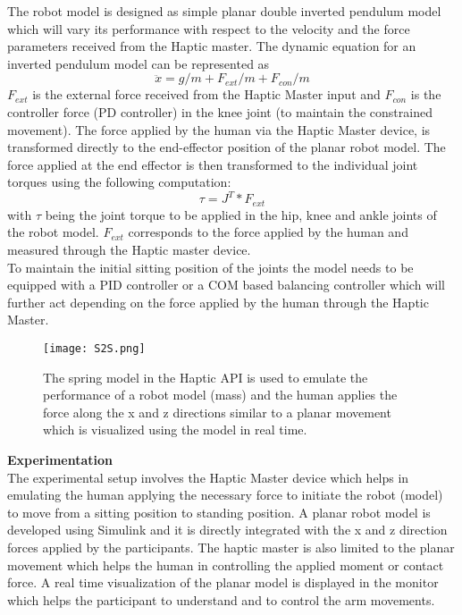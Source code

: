 The robot model is designed as simple planar double inverted pendulum model which will vary its performance with respect to the velocity and the force parameters received from the Haptic master. The dynamic equation for an inverted pendulum model can be represented as  
\begin {equation}
\ddot{x}= g/m+F_{ext}/m+F_{con}/m
\end{equation}
$ F_{ext}$ is the external force received from the Haptic Master input and $F_{con}$ is the controller force (PD controller) in the knee joint (to maintain the constrained movement). The force applied by the human via the Haptic Master device, is transformed directly to the end-effector position of the planar robot model. The force applied at the end effector is then transformed to the individual joint torques using the following computation:
\begin{equation}
\tau=J^{T}*F_{ext}
\end{equation}
with $\tau$ being the joint torque to be applied in the hip, knee and ankle joints of the robot model. $F_{ext}$ corresponds to the force applied by the human and measured through the Haptic master device.\\
To maintain the initial sitting position of the joints the model needs to be equipped with a PID controller or a COM based balancing controller which will further act depending on the force applied by the human through the Haptic Master.  
\begin{figure} 
\centering
\texttt{[image: S2S.png]}
\caption{ The spring model in the Haptic API is used to emulate the performance of a robot model (mass) and the human applies the force along the x and z directions similar to a planar movement which is visualized using the model in real time.}
\label{Humanarmimpedance}
\end{figure}


\textbf{Experimentation}\\
The experimental setup involves the Haptic Master device which helps in emulating the human applying the necessary force to initiate the robot (model) to move from a sitting position to standing position. A planar robot model is developed using Simulink and it is directly integrated with the x and z direction forces applied by the participants. The haptic master is also limited to the planar movement which helps the human in controlling the applied moment or contact force. A real time visualization of the planar model is displayed in the monitor which helps the participant to understand and to control the arm movements.  

